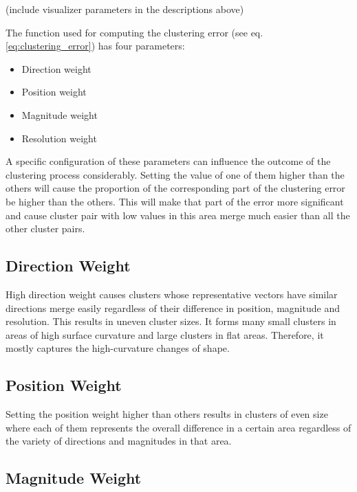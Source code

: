 (include visualizer parameters in the descriptions above)

The function used for computing the clustering error (see eq. \ref{eq:clustering_error}) has four parameters:

\begin{itemize}
\item Direction weight
\item Position weight
\item Magnitude weight
\item Resolution weight
\end{itemize}

A specific configuration of these parameters can influence the outcome of the clustering process considerably. Setting the value of one of them higher than the others will cause the proportion of the corresponding part of the clustering error be higher than the others. This will make that part of the error more significant and cause cluster pair with low values in this area merge much easier than all the other cluster pairs.

\subsection{Direction Weight}

High direction weight causes clusters whose representative vectors have similar directions merge easily regardless of their difference in position, magnitude and resolution. This results in uneven cluster sizes. It forms many small clusters in areas of high surface curvature and large clusters in flat areas. Therefore, it mostly captures the high-curvature changes of shape.
\subsection{Position Weight}

Setting the position weight higher than others results in clusters of even size where each of them represents the overall difference in a certain area regardless of the variety of directions and magnitudes in that area.
\subsection{Magnitude Weight}

